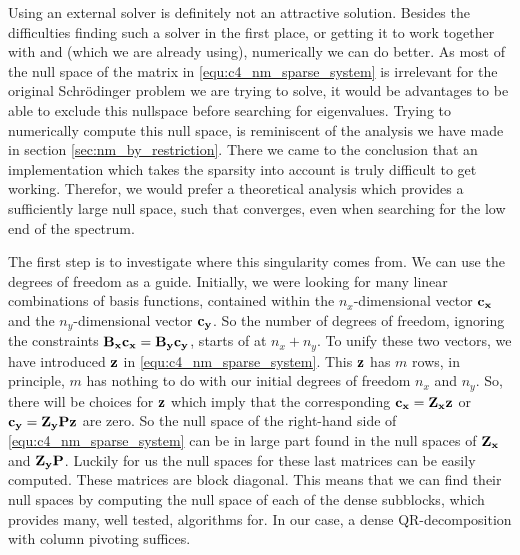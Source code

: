 Using an external solver is definitely not an attractive solution. Besides the difficulties finding such a solver in the first place, or getting it to work together with \slepc{} and \Eigen{} (which we are already using), numerically we can do better. As most of the null space of the matrix in \eqref{equ:c4_nm_sparse_system} is irrelevant for the original Schrödinger problem we are trying to solve, it would be advantages to be able to exclude this nullspace before searching for eigenvalues. Trying to numerically compute this null space, is reminiscent of the analysis we have made in section \ref{sec:nm_by_restriction}. There we came to the conclusion that an implementation which takes the sparsity into account is truly difficult to get working. Therefor, we would prefer a theoretical analysis which provides a sufficiently large null space, such that \slepc{} converges, even when searching for the low end of the spectrum.

The first step is to investigate where this singularity comes from. We can use the degrees of freedom as a guide. Initially, we were looking for many linear combinations of basis functions, contained within the $n_x$-dimensional vector $\vb{c_x}$ and the $n_y$-dimensional vector $\vb{c_y}$. So the number of degrees of freedom, ignoring the constraints $\vb{B_x}\vb{c_x} = \vb{B_y}\vb{c_y}$, starts of at $n_x + n_y$. To unify these two vectors, we have introduced $\vb{z}$ in \eqref{equ:c4_nm_sparse_system}. This $\vb{z}$ has $m$ rows, in principle, $m$ has nothing to do with our initial degrees of freedom $n_x$ and $n_y$. So, there will be choices for $\vb{z}$ which imply that the corresponding $\vb{c_x} = \vb{Z_x} \vb{z}$
or $\vb{c_y} = \vb{Z_y} \vb{P} \vb{z}$ are zero. So the null space of the right-hand side of \eqref{equ:c4_nm_sparse_system} can be in large part found in the null spaces of $\vb{Z_x}$ and $\vb{Z_y} \vb{P}$. Luckily for us the null spaces for these last matrices can be easily computed. These matrices are block diagonal. This means that we can find their null spaces by computing the null space of each of the dense subblocks, which \Eigen{} provides many, well tested, algorithms for. In our case, a dense QR-decomposition with column pivoting suffices.

